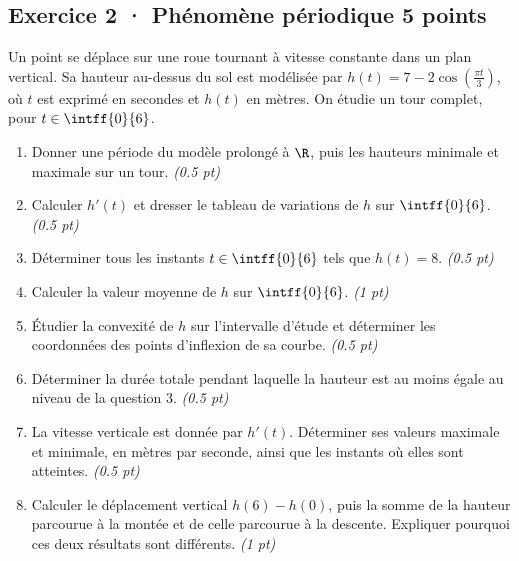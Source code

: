 \subsection*{Exercice 2 · Phénomène périodique \hfill 5 points}Un point se déplace sur une roue tournant à vitesse constante dans un plan vertical. Sa hauteur au-dessus du sol est modélisée par $h(t)=7-2\cos\left(\frac{\pi t}{3}\right)$, où $t$ est exprimé en secondes et $h(t)$ en mètres. On étudie un tour complet, pour $t\in\intff{0}{6}$.

\begin{enumerate}

\item Donner une période du modèle prolongé à $\R$, puis les hauteurs minimale et maximale sur un tour. \hfill\textit{(\num{0,5} pt)}

\item Calculer $h'(t)$ et dresser le tableau de variations de $h$ sur $\intff{0}{6}$. \hfill\textit{(\num{0,5} pt)}

\item Déterminer tous les instants $t\in\intff{0}{6}$ tels que $h(t)=8$. \hfill\textit{(\num{0,5} pt)}

\item Calculer la valeur moyenne de $h$ sur $\intff{0}{6}$. \hfill\textit{(1 pt)}

\item Étudier la convexité de $h$ sur l'intervalle d'étude et déterminer les coordonnées des points d'inflexion de sa courbe. \hfill\textit{(\num{0,5} pt)}

\item Déterminer la durée totale pendant laquelle la hauteur est au moins égale au niveau de la question 3. \hfill\textit{(\num{0,5} pt)}

\item La vitesse verticale est donnée par $h'(t)$. Déterminer ses valeurs maximale et minimale, en mètres par seconde, ainsi que les instants où elles sont atteintes. \hfill\textit{(\num{0,5} pt)}

\item Calculer le déplacement vertical $h(6)-h(0)$, puis la somme de la hauteur parcourue à la montée et de celle parcourue à la descente. Expliquer pourquoi ces deux résultats sont différents. \hfill\textit{(1 pt)}

\end{enumerate}

\mxnewpage{}

